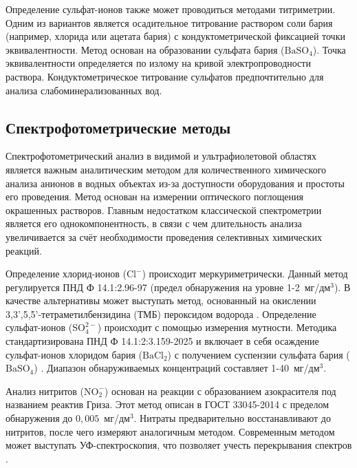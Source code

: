 Определение сульфат-ионов также может проводиться методами титриметрии. Одним из вариантов является осадительное титрование раствором соли бария (например, хлорида или ацетата бария) с кондуктометрической фиксацией точки эквивалентности. Метод основан на образовании сульфата бария ($\text{BaSO}_4$). Точка эквивалентности определяется по излому на кривой электропроводности раствора. Кондуктометрическое титрование сульфатов предпочтительно для анализа слабоминерализованных вод.

\subsection{Спектрофотометрические методы}

Спектрофотометрический анализ в видимой и ультрафиолетовой областях является важным аналитическим методом для количественного химического анализа анионов в водных объектах из-за доступности оборудования и простоты его проведения. Метод основан на измерении оптического поглощения окрашенных растворов. Главным недостатком классической спектрометрии является его однокомпонентность, в связи с чем длительность анализа увеличивается за счёт необходимости проведения селективных химических реакций.

Определение хлорид-ионов ($\text{Cl}^-$) происходит меркуриметрически. Данный метод регулируется ПНД Ф 14.1:2.96-97 \cite{pndf14129697} (предел обнаружения на уровне 1-2~мг/дм$^3$). В качестве альтернативы может выступать метод, основанный на окислении 3,3',5,5'-тетраметилбензидина (ТМБ) пероксидом водорода \cite{vasconcelosChlorideCatalyticDetermination2025}. Определение сульфат-ионов ($\text{SO}_4^{2-}$) происходит с помощью измерения мутности. Методика стандартизирована ПНД Ф 14.1:2:3.159-2025 \cite{pndf141231592025} и включает в себя осаждение сульфат-ионов хлоридом бария ($\text{BaCl}_2$) с получением суспензии сульфата бария ($\text{BaSO}_4$) \cite{jannahAnalasisKonsentrasiIon2021}. Диапазон обнаруживаемых концентраций составляет 1-40~мг/дм$^3$.

Анализ нитритов ($\text{NO}_2^-$) основан на реакции с образованием азокрасителя под названием реактив Гриза. Этот метод описан в ГОСТ 33045-2014 \cite{gost330452014} с пределом обнаружения до $0{,}005$~мг/дм$^3$. Нитраты предварительно восстанавливают до нитритов, после чего измеряют аналогичным методом. Современным методом может выступать УФ-спектроскопия, что позволяет учесть перекрывания спектров \cite{chenUltravioletSpectroscopicDetection2021}.

